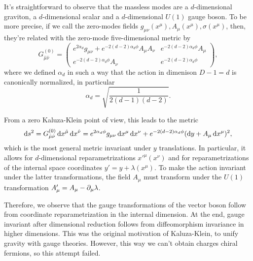 It's straightforward to observe that the massless modes are a $d$-dimensional graviton, a $d$-dimensional scalar and a $d$-dimensional $U(1)$ gauge boson. To be more precise, if we call the zero-modes fields $g_{\mu\nu}(x^\mu), A_\mu(x^\mu), \sigma(x^\mu)$, then, they're related with the zero-mode five-dimensional metric by
\begin{equation}
    G^{(0)}_{\hat{\mu}\hat{\nu}} = 
    \begin{pmatrix}
        e^{2\alpha_d} g_{\mu\nu} + e^{-2(d-2)\alpha_d \phi} A_\mu A_\nu & e^{-2(d-2)\alpha_d \phi} A_\mu \\
        e^{-2(d-2)\alpha_d \phi} A_\nu & e^{-2(d-2)\alpha_d \phi}
    \end{pmatrix} ,
\end{equation}
where we defined $\alpha_d$ in such a way that the action in dimenison $D-1 = d$ is canonically normalized, in particular
\begin{equation}
    \alpha_d = \sqrt{\frac{1}{2(d-1)(d-2)}} .
\end{equation}

From a zero Kaluza-Klein point of view, this leads to the metric
\begin{equation}
    \mathop{}\!\mathrm{d} s^2 = G^{(0)}_{\hat{\mu}\hat{\nu}} \mathop{}\!\mathrm{d} x^{\hat{\mu}} \mathop{}\!\mathrm{d} x^{\hat{\nu}} = e^{2\alpha_d \phi} g_{\mu\nu} \mathop{}\!\mathrm{d} x^\mu \mathop{}\!\mathrm{d} x^\nu + e^{-2(d-2)\alpha_d \phi} (\mathop{}\!\mathrm{d} y + A_\mu \mathop{}\!\mathrm{d} x^\mu)^2 , 
\end{equation}
which is the most general metric invariant under $y$ translations. In particular, it allows for $d$-dimensional reparametrizations $x'^\mu(x^\nu)$ and for reparametrizations of the internal space coordinates $y' = y + \lambda(x^\mu)$. To make the action invariant under the latter transformations, the field $A_\mu$ must transform under the $U(1)$ transformation $A'_\mu = A_\mu - \partial_\mu \lambda$.

Therefore, we observe that the gauge transformations of the vector boson follow from coordinate reparametrization in the internal dimension. At the end, gauge invariant after dimensional reduction follows from diffeomorphism invariance in higher dimensions. This was the original motivation of Kaluza-Klein, to unify gravity with gauge theories. However, this way we can't obtain charges chiral fermions, so this attempt failed.

